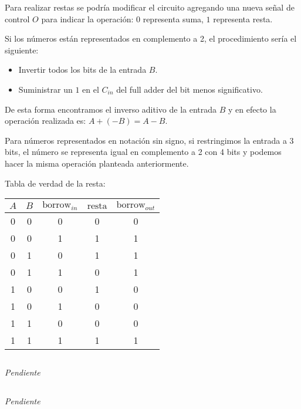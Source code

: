 Para realizar restas se podría modificar el circuito agregando una nueva señal de control $O$ para indicar la operación: $0$ representa suma, $1$ representa resta.

Si los números están representados en complemento a 2, el procedimiento sería el siguiente:

\begin{itemize}
    \item Invertir todos los bits de la entrada $B.$
    \item Suministrar un $1$ en el $C_{in}$ del full adder del bit menos significativo.
\end{itemize}

De esta forma encontramos el inverso aditivo de la entrada $B$ y en efecto la operación realizada es: $A + (-B) = A - B$.

Para números representados en notación sin signo, si restringimos la entrada a 3 bits, el número se representa igual en complemento a 2 con 4 bits y podemos hacer la misma operación planteada anteriormente.

Tabla de verdad de la resta:

\begin{tabular}{|c|c|c||c|c|}
    $A$ & $B$ & $\text{borrow}_{in}$ & $\text{resta}$ & $\text{borrow}_{out}$ \\
    \hline
    0 & 0 & 0 & 0 & 0 \\
    0 & 0 & 1 & 1 & 1 \\
    0 & 1 & 0 & 1 & 1 \\
    0 & 1 & 1 & 0 & 1 \\
    1 & 0 & 0 & 1 & 0 \\
    1 & 0 & 1 & 0 & 0 \\
    1 & 1 & 0 & 0 & 0 \\
    1 & 1 & 1 & 1 & 1 \\
\end{tabular}

\subsection{}

\emph{Pendiente}

\subsection{}

\emph{Pendiente}

